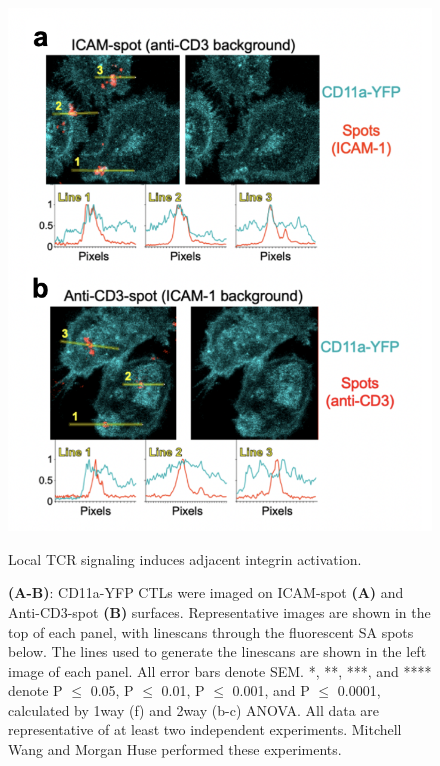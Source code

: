 \begin{figure}[htbp]
	\centering
	\includegraphics[width=0.8\columnwidth]{../figures/chapter3/fig2yfp.png}
	\caption{Local TCR signaling induces adjacent integrin activation.}
	\caption*{\textbf{(A-B)}: CD11a-YFP CTLs were imaged on ICAM-spot \textbf{(A)} and Anti-CD3-spot \textbf{(B)} surfaces. Representative images are shown in the top of each panel, with linescans through the fluorescent SA spots below. The lines used to generate the linescans are shown in the left image of each panel. All error bars denote SEM. *, **, ***, and **** denote P $\leq$ 0.05, P $\leq$ 0.01, P $\leq$ 0.001, and P $\leq$ 0.0001, calculated by 1way (f) and 2way (b-c) ANOVA. All data are representative of at least two independent experiments. Mitchell Wang and Morgan Huse performed these experiments.}
	\label{fig:fig2yfp}
\end{figure}


